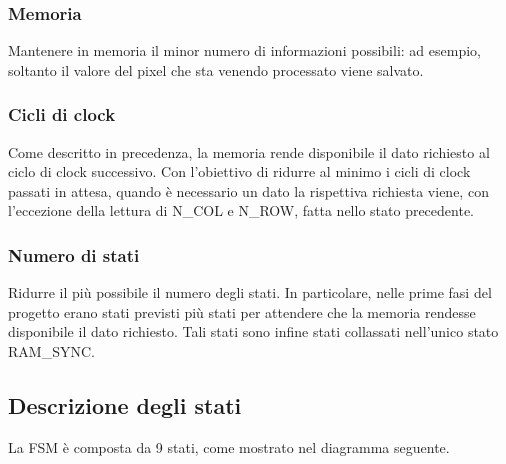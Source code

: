 \documentclass[a4paper, 12pt]{article}
\begin{document}
\subsubsection{Memoria}
Mantenere in memoria il minor numero di informazioni possibili: ad esempio, soltanto il valore del pixel che sta venendo processato viene salvato.

\subsubsection{Cicli di clock}
Come descritto in precedenza, la memoria rende disponibile il dato richiesto al ciclo di clock successivo. Con l'obiettivo di ridurre al minimo i cicli di clock passati in attesa, quando è necessario un dato la rispettiva richiesta viene, con l'eccezione della lettura di N\_COL e N\_ROW, fatta nello stato precedente.

\subsubsection{Numero di stati} 
Ridurre il più possibile il numero degli stati. In particolare, nelle prime fasi del progetto erano stati previsti più stati per attendere che la memoria rendesse disponibile il dato richiesto. Tali stati sono infine stati collassati nell'unico stato RAM\_SYNC.


\pagebreak
\cfoot{\thepage}
\subsection{Descrizione degli stati}
La FSM è composta da 9 stati, come mostrato nel diagramma seguente.
\end{document}
